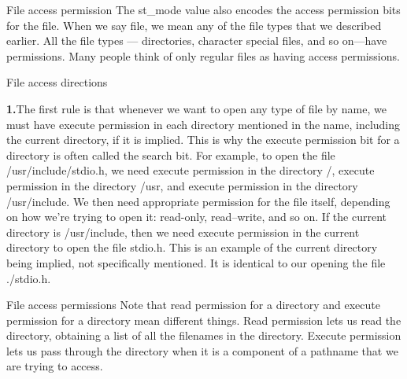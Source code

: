 \documentclass{beamer}
\begin{document}
\begin{frame}[t]{File access permission}
The st\_mode value also encodes the access permission bits for the file. When we say
file, we mean any of the file types that we described earlier. All the file
types — directories, character special files, and so on—have permissions. Many people
think of only regular files as having access permissions.








\end{frame} 
\begin{frame}[t]{File access directions}

\textbf{1.}The first rule is that whenever we want to open any type of file by name, we must
have execute permission in each directory mentioned in the name, including the
current directory, if it is implied. This is why the execute permission bit for a
directory is often called the search bit.
For example, to open the file /usr/include/stdio.h, we need execute
permission in the directory /, execute permission in the directory /usr, and execute
permission in the directory /usr/include. We then need appropriate permission
for the file itself, depending on how we’re trying to open it: read-only, read–write,
and so on.
If the current directory is /usr/include, then we need execute permission in the
current directory to open the file stdio.h. This is an example of the current
directory being implied, not specifically mentioned. It is identical to our opening the
file ./stdio.h.




\end{frame}
\begin{frame}[t]{File access permissions}
Note that read permission for a directory and execute permission for a directory
mean different things. Read permission lets us read the directory, obtaining a list of
all the filenames in the directory. Execute permission lets us pass through the
directory when it is a component of a pathname that we are trying to access.






\end{frame}
\end{document}
